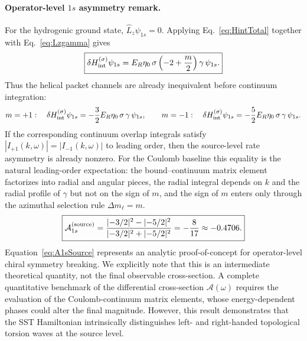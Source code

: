 \documentclass[11pt,a4paper]{article}
\begin{document}
    \paragraph{Operator-level $1s$ asymmetry remark.}
        For the hydrogenic ground state, $\hat L_z\psi_{1s}=0$. Applying Eq.~\eqref{eq:HintTotal} together with Eq.~\eqref{eq:Lzgamma} gives
        \begin{equation}
            \label{eq:Hint1s}
            \boxed{
                \delta H_{\rm int}^{(\sigma)}\psi_{1s}
                =
                E_R\eta_0\,\sigma\left(-2+\frac{m}{2}\right)\gamma\,\psi_{1s}.
            }
        \end{equation}
        Thus the helical packet channels are already inequivalent before continuum integration:
        \begin{equation}
            \label{eq:Hint1sPm}
            m=+1:\quad \delta H_{\rm int}^{(\sigma)}\psi_{1s}=-\frac{3}{2}E_R\eta_0\,\sigma\,\gamma\,\psi_{1s},
            \qquad
            m=-1:\quad \delta H_{\rm int}^{(\sigma)}\psi_{1s}=-\frac{5}{2}E_R\eta_0\,\sigma\,\gamma\,\psi_{1s}.
        \end{equation}
        If the corresponding continuum overlap integrals satisfy $|I_{+1}(k,\omega)|=|I_{-1}(k,\omega)|$ to leading order, then the source-level rate asymmetry is already nonzero. For the Coulomb baseline this equality is the natural leading-order expectation: the bound--continuum matrix element factorizes into radial and angular pieces, the radial integral depends on $k$ and the radial profile of $\gamma$ but not on the sign of $m$, and the sign of $m$ enters only through the azimuthal selection rule $\Delta m_\ell=m$.
        \begin{equation}
            \label{eq:A1sSource}
            \boxed{
                \mathcal A_{1s}^{\rm(source)}
                =
                \frac{|{-3}/{2}|^2-|{-5}/{2}|^2}{|{-3}/{2}|^2+|{-5}/{2}|^2}
                =
                -\frac{8}{17}
                \approx -0.4706.
            }
        \end{equation}
        Equation~\eqref{eq:A1sSource} represents an analytic proof-of-concept for operator-level chiral symmetry breaking. We explicitly note that this is an intermediate theoretical quantity, not the final observable cross-section. A complete quantitative benchmark of the differential cross-section $\mathcal{A}(\omega)$ requires the evaluation of the Coulomb-continuum matrix elements, whose energy-dependent phases could alter the final magnitude. However, this result demonstrates that the SST Hamiltonian intrinsically distinguishes left- and right-handed topological torsion waves at the source level.
        
\end{document}
